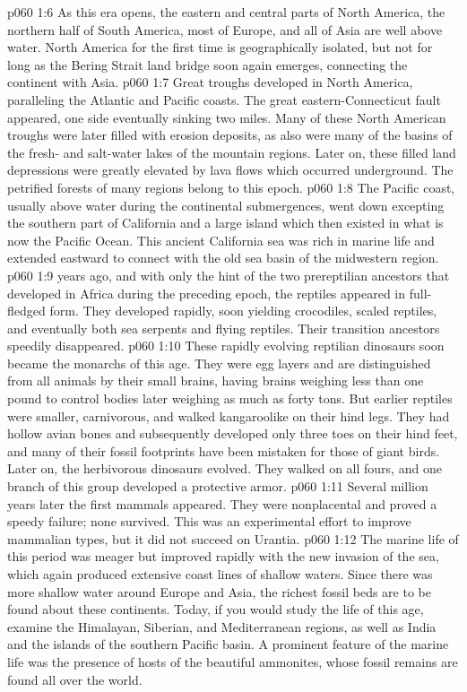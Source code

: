 \vs p060 1:6 As this era opens, the eastern and central parts of North America, the northern half of South America, most of Europe, and all of Asia are well above water. North America for the first time is geographically isolated, but not for long as the Bering Strait land bridge soon again emerges, connecting the continent with Asia.
\vs p060 1:7 Great troughs developed in North America, paralleling the Atlantic and Pacific coasts. The great eastern\hyp{}Connecticut fault appeared, one side eventually sinking two miles. Many of these North American troughs were later filled with erosion deposits, as also were many of the basins of the fresh\hyp{} and salt\hyp{}water lakes of the mountain regions. Later on, these filled land depressions were greatly elevated by lava flows which occurred underground. The petrified forests of many regions belong to this epoch.
\vs p060 1:8 The Pacific coast, usually above water during the continental submergences, went down excepting the southern part of California and a large island which then existed in what is now the Pacific Ocean. This ancient California sea was rich in marine life and extended eastward to connect with the old sea basin of the midwestern region.
\vs p060 1:9 \pc {} years ago,  and with only the hint of the two prereptilian ancestors that developed in Africa during the preceding epoch, the reptiles appeared in full\hyp{}fledged form. They developed rapidly, soon yielding crocodiles, scaled reptiles, and eventually both sea serpents and flying reptiles. Their transition ancestors speedily disappeared.
\vs p060 1:10 These rapidly evolving reptilian dinosaurs soon became the monarchs of this age. They were egg layers and are distinguished from all animals by their small brains, having brains weighing less than one pound to control bodies later weighing as much as forty tons. But earlier reptiles were smaller, carnivorous, and walked kangaroolike on their hind legs. They had hollow avian bones and subsequently developed only three toes on their hind feet, and many of their fossil footprints have been mistaken for those of giant birds. Later on, the herbivorous dinosaurs evolved. They walked on all fours, and one branch of this group developed a protective armor.
\vs p060 1:11 Several million years later the first mammals appeared. They were nonplacental and proved a speedy failure; none survived. This was an experimental effort to improve mammalian types, but it did not succeed on Urantia.
\vs p060 1:12 The marine life of this period was meager but improved rapidly with the new invasion of the sea, which again produced extensive coast lines of shallow waters. Since there was more shallow water around Europe and Asia, the richest fossil beds are to be found about these continents. Today, if you would study the life of this age, examine the Himalayan, Siberian, and Mediterranean regions, as well as India and the islands of the southern Pacific basin. A prominent feature of the marine life was the presence of hosts of the beautiful ammonites, whose fossil remains are found all over the world.
